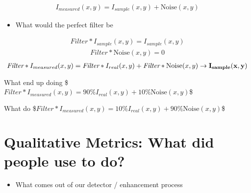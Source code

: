 \documentclass[letterpaper,10pt,english]{sphinxmanual}
\begin{document}
\begin{equation*}
\begin{split} I_{measured}(x,y) = I_{sample}(x,y) + \text{Noise}(x,y) \end{split}
\end{equation*}\begin{itemize}
\item {} 
\sphinxAtStartPar
What would the perfect filter be

\end{itemize}
\begin{equation*}
\begin{split} \textit{Filter} \ast I_{sample}(x,y) = I_{sample}(x,y) \end{split}
\end{equation*}\begin{equation*}
\begin{split} \textit{Filter} \ast \text{Noise}(x,y) = 0 \end{split}
\end{equation*}\begin{equation*}
\begin{split} \textit{Filter} \ast I_{measured}(x,y) = \textit{Filter} \ast I_{real}(x,y) + \textit{Filter}\ast \text{Noise}(x,y) \rightarrow \bf I_{sample}(x,y) \end{split}
\end{equation*}


\sphinxAtStartPar
What  end up doing
\$\( \textit{Filter} \ast I_{measured}(x,y) = 90\%  I_{real}(x,y) + 10\% \text{Noise}(x,y) \)\$





\sphinxAtStartPar
What  do
\$\( \textit{Filter} \ast I_{measured}(x,y) = 10\% I_{real}(x,y) + 90\% \text{Noise}(x,y) \)\$




\chapter{Qualitative Metrics: What did people use to do?}
\label{\detokenize{04-BasicSegmentation:qualitative-metrics-what-did-people-use-to-do}}\begin{itemize}
\item {} 
\sphinxAtStartPar
What comes out of our detector / enhancement process

\end{itemize}
\end{document}
